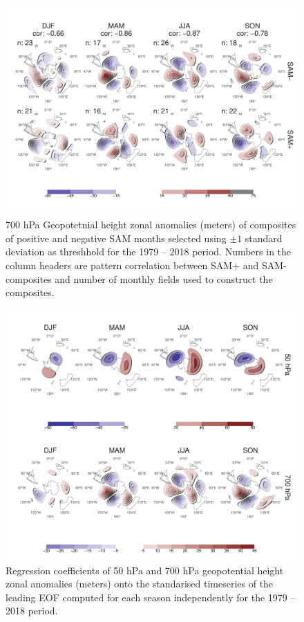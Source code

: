 \documentclass[smallextended]{svjour3}       %
\begin{document}
\begin{figure}
\includegraphics{A4-1} \caption{700 hPa Geopotetnial height zonal anomalies (meters) of composites of positive and negative SAM months selected using $\pm1$ standard deviation as threshhold for the 1979 -- 2018 period. Numbers in the column headers are pattern correlation between SAM+ and SAM- composites and number of monthly fields used to construct the composites.}\label{fig:A4}
\end{figure}

\begin{figure}
\includegraphics{A5-1} \caption{Regression coefficients of 50 hPa and 700 hPa geopotential height zonal anomalies (meters) onto the standarised timeseries of the leading EOF computed for each season independently for the 1979 -- 2018 period.}\label{fig:A5}
\end{figure}
\end{document}
